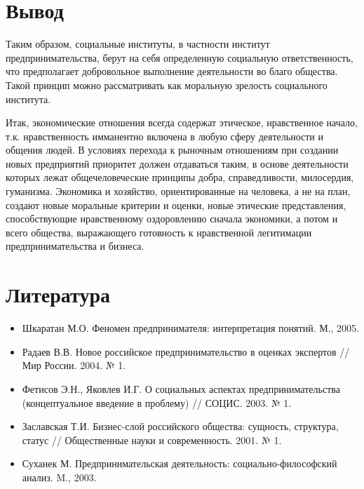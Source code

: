 \documentclass[a4paper, 12pt]{article}%
\begin{document}
\section{Вывод}

Таким образом, социальные институты, в частности институт предпринимательства, берут на себя определенную социальную ответственность, что предполагает добровольное выполнение деятельности во благо общества. Такой принцип можно рассматривать как моральную зрелость социального института.

Итак, экономические отношения всегда содержат этическое, нравственное начало, т.к. нравственность имманентно включена в любую сферу деятельности и общения людей. В условиях перехода к рыночным отношениям при создании новых предприятий приоритет должен отдаваться таким, в основе деятельности которых лежат общечеловеческие принципы добра, справедливости, милосердия, гуманизма. Экономика и хозяйство, ориентированные на человека, а не на план, создают новые моральные критерии и оценки, новые этические представления, способствующие нравственному оздоровлению сначала экономики, а потом и всего общества, выражающего готовность к нравственной легитимации предпринимательства и бизнеса.

\section{Литература}

\begin{itemize}

\item Шкаратан М.О. Феномен предпринимателя: интерпретация понятий. М., 2005.

\item Радаев В.В. Новое российское предпринимательство в оценках экспертов // Мир России. 2004. № 1.

\item Фетисов Э.Н., Яковлев И.Г. О социальных аспектах предпринимательства (концептуальное введение в проблему) // СОЦИС. 2003. № 1.

\item Заславская Т.И. Бизнес-слой российского общества: сущность, структура, статус // Общественные науки и современность. 2001. № 1.

\item Суханек М. Предпринимательская деятельность: социально-философский анализ. M., 2003.

\end{itemize}
\end{document}
